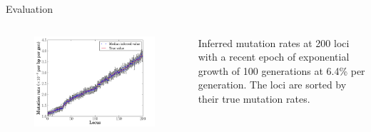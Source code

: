 \documentclass[final,hyperref={pdfpagelabels=false},professionalfonts,mathserif]{beamer}
\begin{document}
\begin{frame}[fragile]
\begin{columns}[t]
\begin{column}{.495\linewidth}
\begin{block}{\large Evaluation}
\begin{columns}[T]
\begin{column}{0.97\linewidth}
				\vspace{-1cm}
				\begin{columns}
				\begin{column}{0.6\linewidth}				
				\begin{figure}[H]
					\includegraphics[width=0.99\linewidth,type=pdf,ext=.pdf,read=.pdf]{figs/our_method_nomad_t100_r6.4_rho0.4_maxb18_plotMus}
				\end{figure}
				\end{column}
				\hspace{-3cm}
				\begin{column}[c]{0.38\linewidth}
				Inferred mutation rates at 200 loci with a recent epoch of exponential growth of 100 generations at 6.4\% per generation. The loci are sorted by their true mutation rates.
				\end{column}
				\end{columns}
				\vspace{-0.5cm}
				


\end{column}
\end{columns}
\end{block}
\end{column}
\end{columns}
\end{frame}
\end{document}
